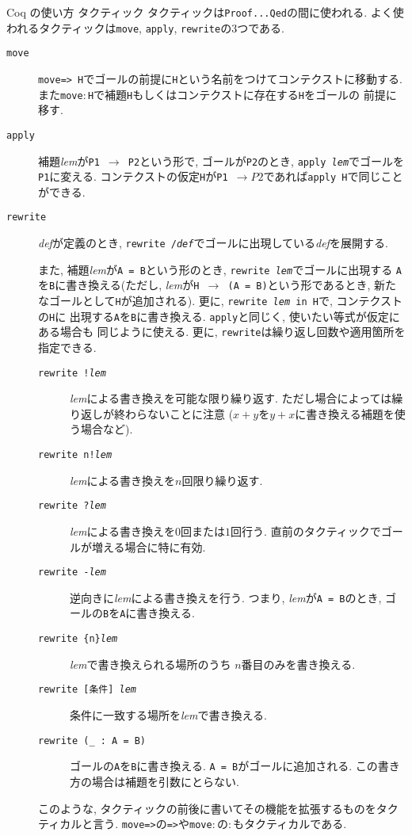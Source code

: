 \documentclass[dvipdfmx,cjk]{beamer}
\theoremstyle{mystyle}
\newcommand{\0}{\textbf{0}}
\begin{document}
\begin{frame}{Coq の使い方 タクティック}
タクティックは{\tt Proof...Qed}の間に使われる. よく使われるタクティックは{\tt move}, {\tt apply}, {\tt rewrite}の3つである. 
\begin{description}
  \item[\tt move]
    {\tt move=> H}でゴールの前提に{\tt H}という名前をつけてコンテクストに移動する. 
    また{\tt move$\colon$H}で補題{\tt H}もしくはコンテクストに存在する{\tt H}をゴールの
    前提に移す. 
  \item[\tt apply]
    補題{\it lem}が{\tt P1 $\to$ P2}という形で, ゴールが{\tt P2}のとき, 
    {\tt apply {\it lem}}でゴールを{\tt P1}に変える. 
    コンテクストの仮定{\tt H}が{\tt P1 $\to P2$}であれば{\tt apply H}で同じことができる. 
  \item[\tt rewrite]
    {\it def}が定義のとき, {\tt rewrite /{\it def}}でゴールに出現している{\it def}を展開する. 
    
    また, 補題{\it lem}が{\tt A = B}という形のとき, {\tt rewrite {\it lem}}でゴールに出現する
    {\tt A}を{\tt B}に書き換える(ただし, {\it lem}が{\tt H $\to$ (A = B)}という形であるとき, 
    新たなゴールとして{\tt H}が追加される). 更に, {\tt rewrite {\it lem} in H}で, コンテクストの{\tt H}に
    出現する{\tt A}を{\tt B}に書き換える. {\tt apply}と同じく, 使いたい等式が仮定にある場合も
    同じように使える. 更に, {\tt rewrite}は繰り返し回数や適用箇所を指定できる.
    \begin{description}
      \item[\tt rewrite !{\it lem}] {\it lem}による書き換えを可能な限り繰り返す. 
        ただし場合によっては繰り返しが終わらないことに注意
        ($x + y$を$y + x$に書き換える補題を使う場合など).
      \item[\tt rewrite n!{\it lem}] {\it lem}による書き換えを$n$回限り繰り返す.
      \item[\tt rewrite ?{\it lem}] {\it lem}による書き換えを$0$回または$1$回行う. 
        直前のタクティックでゴールが増える場合に特に有効. 
      \item[\tt rewrite -{\it lem}] 逆向きに{\it lem}による書き換えを行う. 
        つまり, {\it lem}が{\tt A = B}のとき, ゴールの{\tt B}を{\tt A}に書き換える. 
      \item[\tt rewrite \{n\}{\it lem}] {\it lem}で書き換えられる場所のうち
        $n$番目のみを書き換える. 
      \item[{\tt rewrite [条件] {\it lem}}] 条件に一致する場所を{\it lem}で書き換える.
      \item[\tt rewrite (\_ : A = B)] ゴールの{\tt A}を{\tt B}に書き換える. 
        {\tt A = B}がゴールに追加される. この書き方の場合は補題を引数にとらない. 
    \end{description}
    このような, タクティックの前後に書いてその機能を拡張するものをタクティカルと言う. 
    {\tt move=>}の{\tt =>}や{\tt move$\colon$}の{\tt $\colon$}もタクティカルである. 
\end{description}\end{frame}
\end{document}
